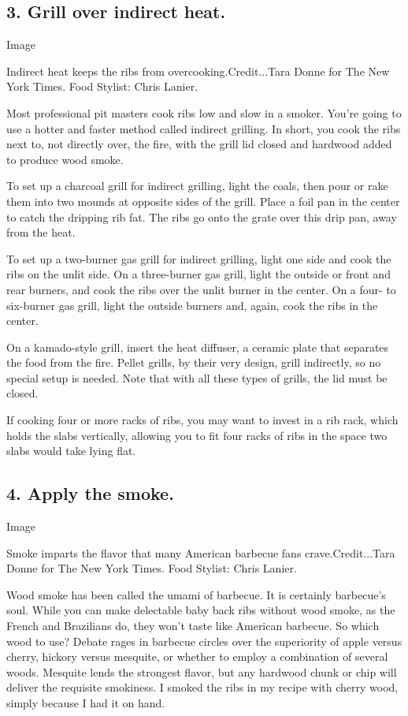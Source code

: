 \hypertarget{3-grill-over-indirect-heat}{%
\subsection{3. Grill over indirect
heat.}\label{3-grill-over-indirect-heat}}

Image

Indirect heat keeps the ribs from overcooking.Credit...Tara Donne for
The New York Times. Food Stylist: Chris Lanier.

Most professional pit masters cook ribs low and slow in a smoker. You're
going to use a hotter and faster method called indirect grilling. In
short, you cook the ribs next to, not directly over, the fire, with the
grill lid closed and hardwood added to produce wood smoke.

To set up a charcoal grill for indirect grilling, light the coals, then
pour or rake them into two mounds at opposite sides of the grill. Place
a foil pan in the center to catch the dripping rib fat. The ribs go onto
the grate over this drip pan, away from the heat.

To set up a two-burner gas grill for indirect grilling, light one side
and cook the ribs on the unlit side. On a three-burner gas grill, light
the outside or front and rear burners, and cook the ribs over the unlit
burner in the center. On a four- to six-burner gas grill, light the
outside burners and, again, cook the ribs in the center.

On a kamado-style grill, insert the heat diffuser, a ceramic plate that
separates the food from the fire. Pellet grills, by their very design,
grill indirectly, so no special setup is needed. Note that with all
these types of grills, the lid must be closed.

If cooking four or more racks of ribs, you may want to invest in a rib
rack, which holds the slabs vertically, allowing you to fit four racks
of ribs in the space two slabs would take lying flat.

\hypertarget{4-apply-the-smoke}{%
\subsection{4. Apply the smoke.}\label{4-apply-the-smoke}}

Image

Smoke imparts the flavor that many American barbecue fans
crave.Credit...Tara Donne for The New York Times. Food Stylist: Chris
Lanier.

Wood smoke has been called the umami of barbecue. It is certainly
barbecue's soul. While you can make delectable baby back ribs without
wood smoke, as the French and Brazilians do, they won't taste like
American barbecue. So which wood to use? Debate rages in barbecue
circles over the superiority of apple versus cherry, hickory versus
mesquite, or whether to employ a combination of several woods. Mesquite
lends the strongest flavor, but any hardwood chunk or chip will deliver
the requisite smokiness. I smoked the ribs in my recipe with cherry
wood, simply because I had it on hand.

